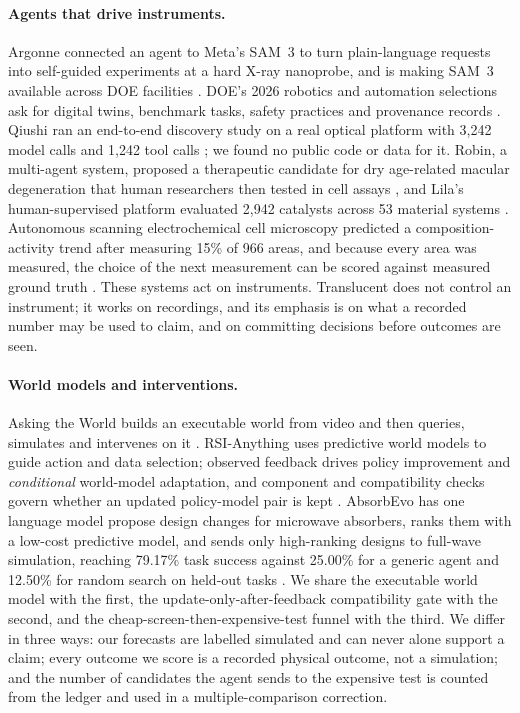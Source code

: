 \documentclass[11pt]{article}
\begin{document}
\paragraph{Agents that drive instruments.} Argonne connected an agent to Meta's SAM~3 to turn plain-language requests
into self-guided experiments at a hard X-ray nanoprobe, and is making SAM~3 available across DOE facilities
\citep{argonne2026synaps}. DOE's 2026 robotics and automation selections ask for digital twins, benchmark tasks,
safety practices and provenance records \citep{doe2026robotics}. Qiushi ran an end-to-end discovery study on a real
optical platform with 3{,}242 model calls and 1{,}242 tool calls \citep{yang2026qiushi}; we found no public code or
data for it. Robin, a multi-agent system, proposed a therapeutic candidate for dry age-related macular degeneration
that human researchers then tested in cell assays \citep{ghareeb2026robin}, and Lila's human-supervised platform
evaluated 2{,}942 catalysts across 53 material systems \citep{jenewein2026lila}. Autonomous scanning electrochemical
cell microscopy predicted a composition-activity trend after measuring 15\% of 966 areas, and because every area was
measured, the choice of the next measurement can be scored against measured ground truth \citep{thelen2026seccm}.
These systems act on instruments. Translucent does not control an instrument; it works on recordings, and its
emphasis is on what a recorded number may be used to claim, and on committing decisions before outcomes are seen.

\paragraph{World models and interventions.} Asking the World builds an executable world from video and then queries,
simulates and intervenes on it \citep{zeng2026asking}. RSI-Anything uses predictive world models to guide action and
data selection; observed feedback drives policy improvement and \emph{conditional} world-model adaptation, and
component and compatibility checks govern whether an updated policy-model pair is kept \citep{cui2026rsianything}.
AbsorbEvo has one language model propose design changes for microwave absorbers, ranks them with a low-cost
predictive model, and sends only high-ranking designs to full-wave simulation, reaching 79.17\% task success against
25.00\% for a generic agent and 12.50\% for random search on held-out tasks \citep{feng2026absorbevo}. We share the
executable world model with the first, the update-only-after-feedback compatibility gate with the second, and the
cheap-screen-then-expensive-test funnel with the third. We differ in three ways: our forecasts are labelled simulated
and can never alone support a claim; every outcome we score is a recorded physical outcome, not a simulation; and the
number of candidates the agent sends to the expensive test is counted from the ledger and used in a multiple-comparison
correction.
\end{document}

